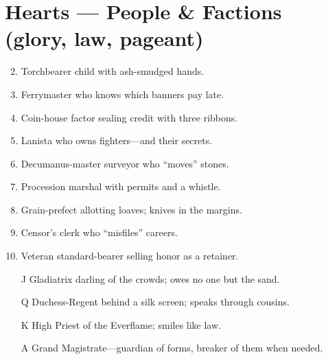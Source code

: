 \section*{Hearts --- People \& Factions (glory, law, pageant)}
\label{sec:ecktoria-people}
\begin{enumerate}
\setcounter{enumi}{1}
\item Torchbearer child with ash-smudged hands.
\item Ferrymaster who knows which banners pay late.
\item Coin-house factor sealing credit with three ribbons.
\item Lanista who owns fighters---and their secrets.
\item Decumanus-master surveyor who ``moves'' stones.
\item Procession marshal with permits and a whistle.
\item Grain-prefect allotting loaves; knives in the margins.
\item Censor's clerk who ``misfiles'' careers.
\item Veteran standard-bearer selling honor as a retainer.
\item[J] Gladiatrix darling of the crowds; owes no one but the sand.
\item[Q] Duchess-Regent behind a silk screen; speaks through cousins.
\item[K] High Priest of the Everflame; smiles like law.
\item[A] Grand Magistrate---guardian of forms, breaker of them when needed.
\end{enumerate}

